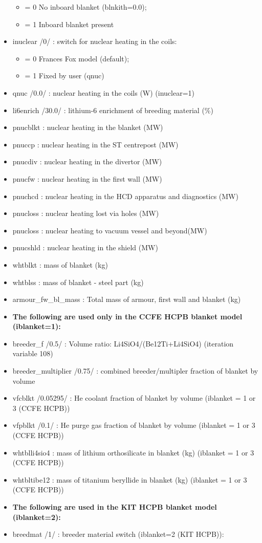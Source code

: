 \documentclass[]{article}
\begin{document}
\begin{itemize}
  \begin{itemize}
  \itemsep1pt\parskip0pt
  \item
    = 0 No inboard blanket (blnkith=0.0);
  \item
    = 1 Inboard blanket present
  \end{itemize}
\item
  inuclear /0/ : switch for nuclear heating in the coils:

  \begin{itemize}
  \itemsep1pt\parskip0pt
  \item
    = 0 Frances Fox model (default);
  \item
    = 1 Fixed by user (qnuc)
  \end{itemize}
\item
  qnuc /0.0/ : nuclear heating in the coils (W) (inuclear=1)
\item
  li6enrich /30.0/ : lithium-6 enrichment of breeding material (\%)
\item
  pnucblkt : nuclear heating in the blanket (MW)
\item
  pnuccp : nuclear heating in the ST centrepost (MW)
\item
  pnucdiv : nuclear heating in the divertor (MW)
\item
  pnucfw : nuclear heating in the first wall (MW)
\item
  pnuchcd : nuclear heating in the HCD apparatus and diagnostics (MW)
\item
  pnucloss : nuclear heating lost via holes (MW)
\item
  pnucloss : nuclear heating to vacuum vessel and beyond(MW)
\item
  pnucshld : nuclear heating in the shield (MW)
\item
  whtblkt : mass of blanket (kg)
\item
  whtblss : mass of blanket - steel part (kg)
\item
  armour\_fw\_bl\_mass : Total mass of armour, first wall and blanket
  (kg)
\item
  \textbf{The following are used only in the CCFE HCPB blanket model
  (iblanket=1):}
\item
  breeder\_f /0.5/ : Volume ratio: Li4SiO4/(Be12Ti+Li4SiO4) (iteration
  variable 108)
\item
  breeder\_multiplier /0.75/ : combined breeder/multipler fraction of
  blanket by volume
\item
  vfcblkt /0.05295/ : He coolant fraction of blanket by volume (iblanket
  = 1 or 3 (CCFE HCPB))
\item
  vfpblkt /0.1/ : He purge gas fraction of blanket by volume (iblanket =
  1 or 3 (CCFE HCPB))
\item
  whtblli4sio4 : mass of lithium orthosilicate in blanket (kg) (iblanket
  = 1 or 3 (CCFE HCPB))
\item
  whtbltibe12 : mass of titanium beryllide in blanket (kg) (iblanket = 1
  or 3 (CCFE HCPB))
\item
  \textbf{The following are used in the KIT HCPB blanket model
  (iblanket=2):}
\item
  breedmat /1/ : breeder material switch (iblanket=2 (KIT HCPB)):


\end{itemize}
\end{document}
